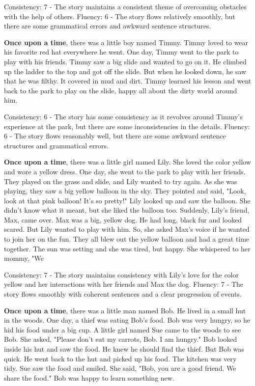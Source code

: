 \documentclass{article}
\begin{document}
Consistency: 7 - The story maintains a consistent theme of overcoming obstacles with the help of others.
Fluency: 6 - The story flows relatively smoothly, but there are some grammatical errors and awkward sentence structures.

\textbf{Once upon a time}, there was a little boy named Timmy. Timmy loved to wear his favorite red hat everywhere he went. One day, Timmy went to the park to play with his friends. Timmy saw a big slide and wanted to go on it. He climbed up the ladder to the top and got off the slide. But when he looked down, he saw that he was filthy. It covered in mud and dirt. Timmy learned his lesson and went back to the park to play on the slide, happy all about the dirty world around him.

Consistency: 6 - The story has some consistency as it revolves around Timmy's experience at the park, but there are some inconsistencies in the details.
Fluency: 6 - The story flows reasonably well, but there are some awkward sentence structures and grammatical errors.

\textbf{Once upon a time}, there was a little girl named Lily. She loved the color yellow and wore a yellow dress. One day, she went to the park to play with her friends. They played on the grass and slide, and Lily wanted to try again. As she was playing, they saw a big yellow balloon in the sky. They pointed and said, "Look, look at that pink balloon! It's so pretty!" Lily looked up and saw the balloon. She didn't know what it meant, but she liked the balloon too. Suddenly, Lily's friend, Max, came over. Max was a big, yellow dog. He had long, black fur and looked scared. But Lily wanted to play with him. So, she asked Max's voice if he wanted to join her on the fun. They all blew out the yellow balloon and had a great time together. The sun was setting and she was tired, but happy. She whispered to her mommy, "We

Consistency: 7 - The story maintains consistency with Lily's love for the color yellow and her interactions with her friends and Max the dog.
Fluency: 7 - The story flows smoothly with coherent sentences and a clear progression of events.

\textbf{Once upon a time}, there was a little man named Bob. He lived in a small hut in the woods. One day, a thief was eating Bob's food. Bob was very hungry, so he hid his food under a big cup. A little girl named Sue came to the woods to see Bob. She asked, "Please don't eat my carrots, Bob. I am hungry." Bob looked inside his hut and saw the food. He knew he should find the thief. But Bob was quick. He went back to the hut and picked up his food. The kitchen was very tidy. Sue saw the food and smiled. She said, "Bob, you are a good friend. We share the food." Bob was happy to learn something new.
\end{document}
